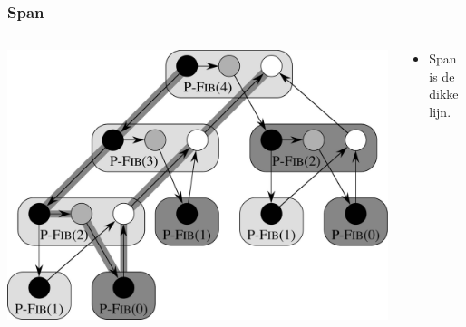 \documentclass
   [kulak] %
   {kulakbeamer}
\begin{document}
\begin{frame}
	\frametitle{Span}
	
	\begin{columns}[T]
		\begin{column}{.7\textwidth}
			\includegraphics[height=0.7\textheight]{fig2.jpg}			
		\end{column}
		\begin{column}{.25\textwidth}
			\begin{minipage}[c][.6\textheight][c]{\linewidth}
				\begin{itemize}
					\item[]Span is de dikke lijn.
				\end{itemize}
				
				
			\end{minipage}
		\end{column}
	\end{columns}
\end{frame}
\end{document}

